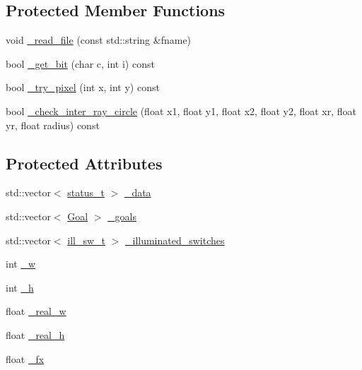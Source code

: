 \subsection*{Protected Member Functions}
\begin{DoxyCompactItemize}
\item 
void \hyperlink{classfastsim_1_1_map_a21e041dd2ef66191cea723e284e89f60}{\+\_\+read\+\_\+file} (const std\+::string \&fname)
\item 
bool \hyperlink{classfastsim_1_1_map_a116f99edae990688deb4b349cc152115}{\+\_\+get\+\_\+bit} (char c, int i) const 
\item 
bool \hyperlink{classfastsim_1_1_map_a91cadb3d186865563c9a04de1b150373}{\+\_\+try\+\_\+pixel} (int x, int y) const 
\item 
bool \hyperlink{classfastsim_1_1_map_a60ad3472438cce6b22d3558e36cef61f}{\+\_\+check\+\_\+inter\+\_\+ray\+\_\+circle} (float x1, float y1, float x2, float y2, float xr, float yr, float radius) const 
\end{DoxyCompactItemize}
\subsection*{Protected Attributes}
\begin{DoxyCompactItemize}
\item 
std\+::vector$<$ \hyperlink{classfastsim_1_1_map_ae0ff811304fed4a4ca33e4676534a9aa}{status\+\_\+t} $>$ \hyperlink{classfastsim_1_1_map_a5725386b285f639ebf7f6ad42f9c022f}{\+\_\+data}
\item 
std\+::vector$<$ \hyperlink{classfastsim_1_1_goal}{Goal} $>$ \hyperlink{classfastsim_1_1_map_a6606dd5d224e85220886757f0a50aa88}{\+\_\+goals}
\item 
std\+::vector$<$ \hyperlink{classfastsim_1_1_map_a998d356ac6ce470e714e8945150eac6e}{ill\+\_\+sw\+\_\+t} $>$ \hyperlink{classfastsim_1_1_map_af940fd8e691c07a1d1c2f8a174ca5f8a}{\+\_\+illuminated\+\_\+switches}
\item 
int \hyperlink{classfastsim_1_1_map_a952681216aa1c5eff326c34d5fbaf466}{\+\_\+w}
\item 
int \hyperlink{classfastsim_1_1_map_acbbb1f1aab5328e221e3864ca8782a6f}{\+\_\+h}
\item 
float \hyperlink{classfastsim_1_1_map_a780aa3a8cd7eb96f475ac51204703f77}{\+\_\+real\+\_\+w}
\item 
float \hyperlink{classfastsim_1_1_map_a52182064b7db52725027baceb01b4fb2}{\+\_\+real\+\_\+h}
\item 
float \hyperlink{classfastsim_1_1_map_a083aed83c1ff073561d5b21c52b5529a}{\+\_\+fx}
\end{DoxyCompactItemize}


